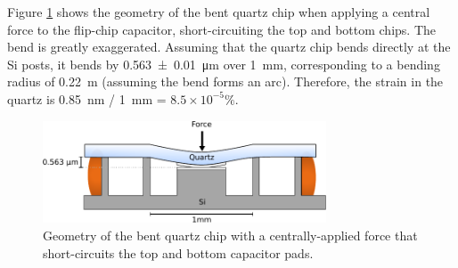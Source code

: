 \documentclass{beavtex_dub_edit}
\begin{document}
Figure \ref{quartz bending} shows the geometry of the bent quartz chip when applying a central force to the flip-chip capacitor, short-circuiting the top and bottom chips. The bend is greatly exaggerated. Assuming that the quartz chip bends directly at the Si posts, it bends by \SI{0.563(10)}{\micro\meter} over \SI{1}{\milli\meter}, corresponding to a bending radius of \SI{0.22}{\meter} (assuming the bend forms an arc). Therefore, the strain in the quartz is \SI{0.85}{\nano\meter} / \SI{1}{\milli\meter} = $8.5 \times 10^{-5} \% $.


\begin{figure}
    \includegraphics[width = 0.75\textwidth]{quartz bending.pdf}
    \caption{Geometry of the bent quartz chip with a centrally-applied force that short-circuits the top and bottom capacitor pads.}
    \label{quartz bending}
\end{figure}
\end{document}
